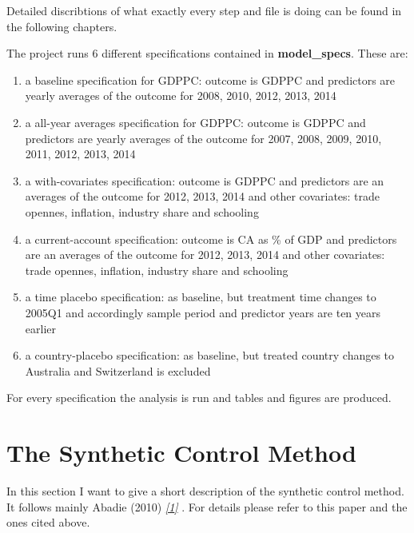 \documentclass[a4paper,11pt,english]{sphinxmanual}
\begin{document}
Detailed discribtions of what exactly every step and file is doing can be found in the following chapters.

The project runs 6 different specifications contained in \textbf{model\_specs}. These are:
\begin{enumerate}
\item {} 
a baseline specification for GDPPC: outcome is GDPPC and predictors are yearly averages of the outcome for 2008, 2010, 2012, 2013, 2014

\item {} 
a all-year averages specification for GDPPC: outcome is GDPPC and predictors are yearly averages of the outcome for 2007, 2008, 2009, 2010, 2011, 2012, 2013, 2014

\item {} 
a with-covariates specification: outcome is GDPPC and predictors are an averages of the outcome for 2012, 2013, 2014 and other covariates: trade opennes, inflation, industry share and schooling

\item {} 
a current-account specification: outcome is CA as \% of GDP and predictors are an averages of the outcome for 2012, 2013, 2014 and other covariates: trade opennes, inflation, industry share and schooling

\item {} 
a time placebo specification: as baseline, but treatment time changes to 2005Q1 and accordingly sample period and predictor years are ten years earlier

\item {} 
a country-placebo specification: as baseline, but treated country changes to Australia and Switzerland is excluded

\end{enumerate}

For every specification the analysis is run and tables and figures are produced.


\section{The Synthetic Control Method}
\label{introduction:the-synthetic-control-method}
In this section I want to give a short description of the synthetic control method. It follows mainly Abadie (2010) \label{introduction:id7}{\hyperref[references:abadie2010]{\emph{{[}1{]}}}} . For details please refer to this paper and the ones cited above.
\end{document}
